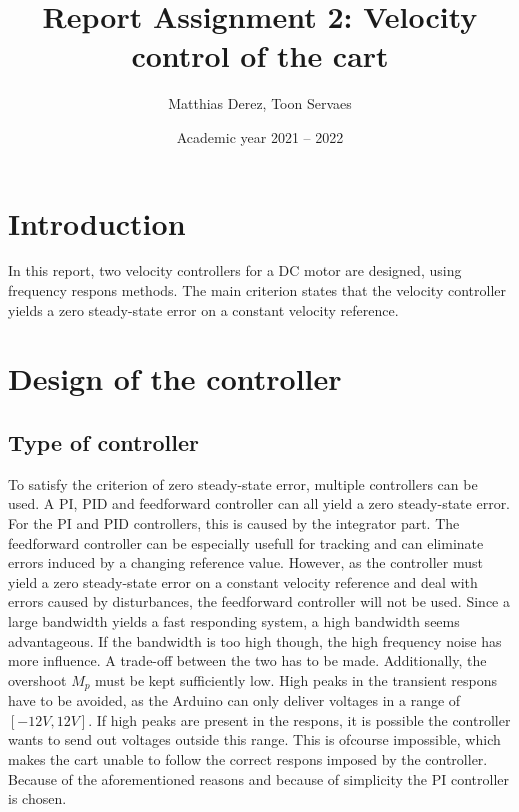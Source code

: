 \documentclass[a4paper,kul]{kulakarticle} %
\date{Academic year 2021 -- 2022}
\title{Report Assignment 2: Velocity control of the cart}
\author{Matthias Derez, Toon Servaes}
\begin{document}
\maketitle


\listoffigures
\listoftables

\newpage
\section{Introduction}
In this report, two velocity controllers for a DC motor are designed, using frequency respons methods. The main criterion states that the velocity controller yields a zero steady-state error on a constant velocity reference. 
\section{Design of the controller}
\subsection{Type of controller}
\label{sec: typecontroller}
To satisfy the criterion of zero steady-state error, multiple controllers can be used. A PI, PID and feedforward controller can all yield a zero steady-state error. For the PI and PID controllers, this is caused by the integrator part. The feedforward controller can be especially usefull for tracking and can eliminate errors induced by a changing reference value. However, as the controller must yield a zero steady-state error on a constant velocity reference and deal with errors caused by disturbances, the feedforward controller will not be used. Since a large bandwidth yields a fast responding system, a high bandwidth seems advantageous. If the bandwidth is too high though, the high frequency noise has more influence. A trade-off between the two has to be made. Additionally, the overshoot $M_p$ must be kept sufficiently low. High peaks in the transient respons have to be avoided, as the Arduino can only deliver voltages in a range of $[-12V, 12V]$. If high peaks are present in the respons, it is possible the controller wants to send out voltages outside this range. This is ofcourse impossible, which makes the cart unable to follow the correct respons imposed by the controller. %
Because of the aforementioned reasons and because of simplicity the PI controller is chosen.
\end{document}

